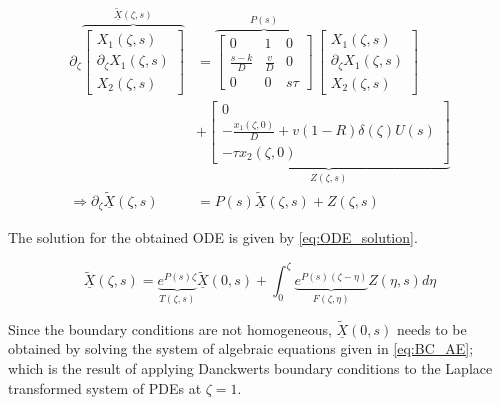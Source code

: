 \begin{equation} \label{eq:laplace_transformed}
\begin{aligned}
    \partial_\zeta \overbrace{\begin{bmatrix}
        X_1(\zeta,s)\\ \partial_\zeta X_1(\zeta,s)\\ X_2(\zeta,s)
    \end{bmatrix}}^{\underline{\tilde{X}}(\zeta,s)} &= \overbrace{\begin{bmatrix}
        0 & 1 & 0\\
        \frac{s-k}{D} & \frac{v}{D} & 0\\
        0 & 0 & s\tau
        \end{bmatrix}}^{P(s)} \, \begin{bmatrix}
            X_1(\zeta,s)\\ \partial_\zeta X_1(\zeta,s)\\ X_2(\zeta,s)
        \end{bmatrix} \\
        &+ \underbrace{\begin{bmatrix}
            0\\ -\frac{x_1(\zeta,0)}{D} + v(1-R) \delta(\zeta) U(s)\\ -\tau x_2(\zeta,0)
        \end{bmatrix}}_{Z(\zeta,s)} \\
        \Rightarrow \partial_\zeta \underline{\tilde{X}}(\zeta,s) &= P(s) \underline{\tilde{X}}(\zeta,s) + Z(\zeta,s)
\end{aligned}
\end{equation} 

The solution for the obtained ODE is given by \eqref{eq:ODE_solution}.

\begin{equation} \label{eq:ODE_solution}
    \underline{\tilde{X}}(\zeta,s) = \underbrace{e^{P(s)\zeta}}_{T(\zeta,s)} \underline{\tilde{X}}(0,s) + \int_0^\zeta \underbrace{e^{P(s)(\zeta - \eta)}}_{F(\zeta, \eta)} Z(\eta,s) d\eta
\end{equation}

Since the boundary conditions are not homogeneous, $\underline{\tilde{X}}(0,s)$ needs to be obtained by solving the system of algebraic equations given in \eqref{eq:BC_AE}; which is the result of applying Danckwerts boundary conditions to the Laplace transformed system of PDEs at $\zeta = 1$.

